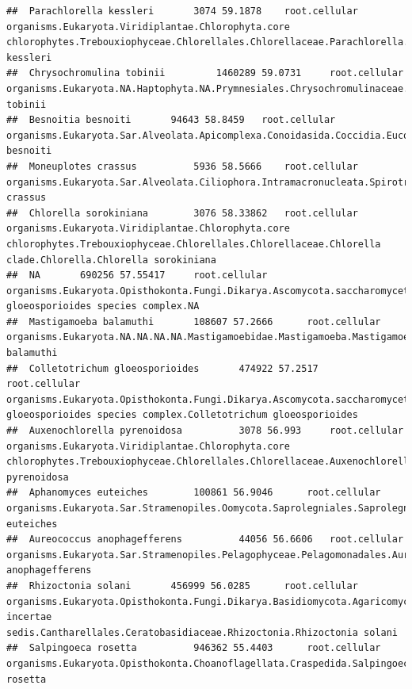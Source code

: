 \documentclass{article}\usepackage[]{graphicx}\usepackage[]{color}
\makeatletter
\newenvironment{kframe}{%
 \def\at@end@of@kframe{}%
 \ifinner\ifhmode%
  \def\at@end@of@kframe{\end{minipage}}%
  \begin{minipage}{\columnwidth}%
 \fi\fi%
 \def\FrameCommand##1{\hskip\@totalleftmargin \hskip-\fboxsep
 \colorbox{shadecolor}{##1}\hskip-\fboxsep
     \hskip-\linewidth \hskip-\@totalleftmargin \hskip\columnwidth}%
 \MakeFramed {\advance\hsize-\width
   \@totalleftmargin\z@ \linewidth\hsize
   \@setminipage}}%
 {\par\unskip\endMakeFramed%
 \at@end@of@kframe}
\newenvironment{knitrout}{}{} %
\makeatother
\begin{document}
\begin{knitrout}
\begin{kframe}
\begin{verbatim}
##  Parachlorella kessleri 		 3074 59.1878 	 root.cellular organisms.Eukaryota.Viridiplantae.Chlorophyta.core chlorophytes.Trebouxiophyceae.Chlorellales.Chlorellaceae.Parachlorella.Parachlorella kessleri
##  Chrysochromulina tobinii 		 1460289 59.0731 	 root.cellular organisms.Eukaryota.NA.Haptophyta.NA.Prymnesiales.Chrysochromulinaceae.Chrysochromulina.Chrysochromulina tobinii
##  Besnoitia besnoiti 		 94643 58.8459 	 root.cellular organisms.Eukaryota.Sar.Alveolata.Apicomplexa.Conoidasida.Coccidia.Eucoccidiorida.Eimeriorina.Sarcocystidae.Besnoitia.Besnoitia besnoiti
##  Moneuplotes crassus 		 5936 58.5666 	 root.cellular organisms.Eukaryota.Sar.Alveolata.Ciliophora.Intramacronucleata.Spirotrichea.Hypotrichia.Euplotida.Euplotidae.Moneuplotes.Moneuplotes crassus
##  Chlorella sorokiniana 		 3076 58.33862 	 root.cellular organisms.Eukaryota.Viridiplantae.Chlorophyta.core chlorophytes.Trebouxiophyceae.Chlorellales.Chlorellaceae.Chlorella clade.Chlorella.Chlorella sorokiniana
##  NA 		 690256 57.55417 	 root.cellular organisms.Eukaryota.Opisthokonta.Fungi.Dikarya.Ascomycota.saccharomyceta.Pezizomycotina.leotiomyceta.sordariomyceta.Sordariomycetes.Hypocreomycetidae.Glomerellales.NA.Colletotrichum.Colletotrichum gloeosporioides species complex.NA
##  Mastigamoeba balamuthi 		 108607 57.2666 	 root.cellular organisms.Eukaryota.NA.NA.NA.NA.Mastigamoebidae.Mastigamoeba.Mastigamoeba balamuthi
##  Colletotrichum gloeosporioides 		 474922 57.2517 	 root.cellular organisms.Eukaryota.Opisthokonta.Fungi.Dikarya.Ascomycota.saccharomyceta.Pezizomycotina.leotiomyceta.sordariomyceta.Sordariomycetes.Hypocreomycetidae.Glomerellales.NA.Colletotrichum.Colletotrichum gloeosporioides species complex.Colletotrichum gloeosporioides
##  Auxenochlorella pyrenoidosa 		 3078 56.993 	 root.cellular organisms.Eukaryota.Viridiplantae.Chlorophyta.core chlorophytes.Trebouxiophyceae.Chlorellales.Chlorellaceae.Auxenochlorella.Auxenochlorella pyrenoidosa
##  Aphanomyces euteiches 		 100861 56.9046 	 root.cellular organisms.Eukaryota.Sar.Stramenopiles.Oomycota.Saprolegniales.Saprolegniaceae.Aphanomyces.Aphanomyces euteiches
##  Aureococcus anophagefferens 		 44056 56.6606 	 root.cellular organisms.Eukaryota.Sar.Stramenopiles.Pelagophyceae.Pelagomonadales.Aureococcus.Aureococcus anophagefferens
##  Rhizoctonia solani 		 456999 56.0285 	 root.cellular organisms.Eukaryota.Opisthokonta.Fungi.Dikarya.Basidiomycota.Agaricomycotina.Agaricomycetes.Agaricomycetes incertae sedis.Cantharellales.Ceratobasidiaceae.Rhizoctonia.Rhizoctonia solani
##  Salpingoeca rosetta 		 946362 55.4403 	 root.cellular organisms.Eukaryota.Opisthokonta.Choanoflagellata.Craspedida.Salpingoecidae.Salpingoeca.Salpingoeca rosetta

\end{verbatim}
\end{kframe}
\end{knitrout}
\end{document}
